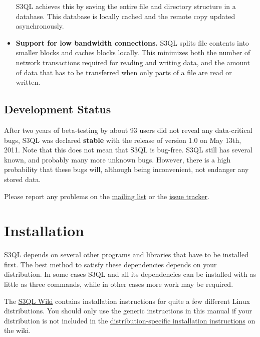 \documentclass[letterpaper,10pt,english]{sphinxmanual}
\begin{document}
\begin{itemize}
S3QL achieves this by saving the entire file and directory structure
in a database. This database is locally cached and the remote
copy updated asynchronously.

\item {} 
\textbf{Support for low bandwidth connections.} S3QL splits file contents
into smaller blocks and caches blocks locally. This minimizes both
the number of network transactions required for reading and writing
data, and the amount of data that has to be transferred when only
parts of a file are read or written.

\end{itemize}


\section{Development Status}
\label{about:development-status}
After two years of beta-testing by about 93 users did not reveal any
data-critical bugs, S3QL was declared \textbf{stable} with the release of
version 1.0 on May 13th, 2011. Note that this does not mean that S3QL
is bug-free. S3QL still has several known, and probably many more
unknown bugs. However, there is a high probability that these bugs
will, although being inconvenient, not endanger any stored data.

Please report any problems on the \href{http://groups.google.com/group/s3ql}{mailing list} or the \href{http://code.google.com/p/s3ql/issues/list}{issue tracker}.


\chapter{Installation}
\label{installation:installation}\label{installation::doc}
S3QL depends on several other programs and libraries that have to be
installed first. The best method to satisfy these dependencies depends
on your distribution. In some cases S3QL and all its dependencies can
be installed with as little as three commands, while in other cases more work
may be required.

The \href{http://code.google.com/p/s3ql/w/list}{S3QL Wiki} contains
installation instructions for quite a few different Linux
distributions. You should only use the generic instructions in this
manual if your distribution is not included in the \href{http://code.google.com/p/s3ql/w/list?q=label:Installation}{distribution-specific
installation instructions} on the wiki.
\end{document}
